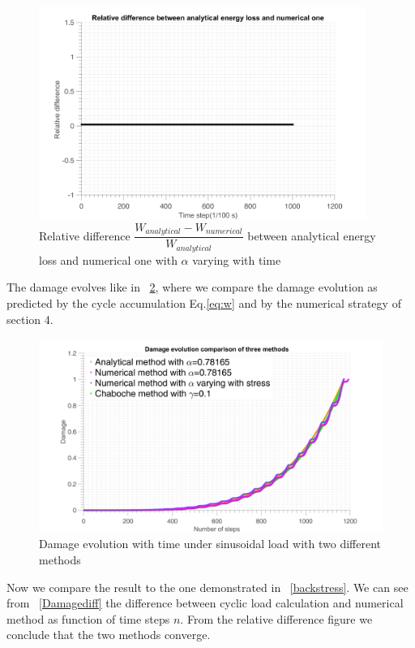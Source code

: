 \documentclass[3p,times,number,review]{elsarticle}
\newcommand{\figref}[1]{\figurename~\ref{#1}}
\begin{document}
\begin{figure}[!h]
	\centering
	\includegraphics[width=0.95\textwidth]{figures//W_3methods_diff.png} 
	\caption{Relative difference $\dfrac{W_{analytical}-W_{numerical}}{W_{analytical}}$ between analytical energy loss and numerical one with $\alpha$ varying with time}
	\label{fig.W3methodsdiff}
\end{figure}
The damage evolves like in \figref{damsin}, where we compare the damage evolution as predicted by the cycle accumulation Eq.\eqref{eq:w} and by the numerical strategy of section 4.

\begin{figure}[!h]
	\centering
	\includegraphics[width=\textwidth]{figures//damagesin.png} 
	\caption{Damage evolution with time under sinusoidal load with two different methods}
	\label{damsin}
\end{figure}

Now we compare the result to the one demonstrated in \figref{backstress}.  We can see from \figref{Damagediff}  the difference between cyclic load calculation and numerical method as function of time steps $n$. From the relative difference figure we conclude that the two methods converge.
\end{document}
